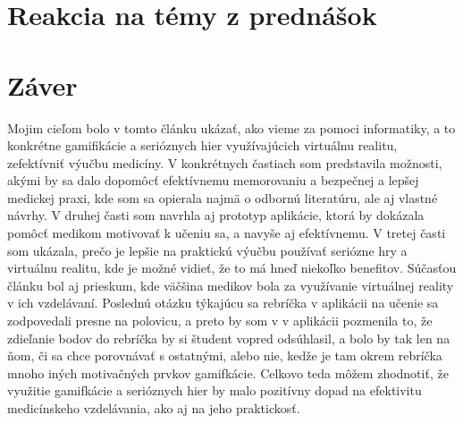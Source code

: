 \documentclass[10pt,twoside,slovak,a4paper]{article}
\begin{document}
\section{Reakcia na témy z prednášok} \label{prednasky}


\section{Záver} \label{zaver} 
Mojim cieľom bolo v tomto článku ukázať, ako vieme za pomoci informatiky, a to konkrétne gamifikácie a serióznych hier využívajúcich virtuálnu realitu, zefektívniť výučbu medicíny. V konkrétnych častiach som predstavila možnosti, akými by sa dalo dopomôcť efektívnemu memorovaniu a bezpečnej a lepšej medickej praxi, kde som sa opierala najmä o odbornú literatúru, ale aj vlastné návrhy. V druhej časti som navrhla aj prototyp aplikácie, ktorá by dokázala pomôcť medikom motivovať k učeniu sa, a navyše aj efektívnemu. V tretej časti som ukázala, prečo je lepšie na praktickú výučbu používať seriózne hry a virtuálnu realitu, kde je možné vidieť, že to má hneď niekoľko benefitov. Súčasťou článku bol aj prieskum, kde väčšina medikov bola za využívanie virtuálnej reality v ich vzdelávaní. Poslednú otázku týkajúcu sa rebríčka v aplikácii na učenie sa zodpovedali presne na polovicu, a preto by som v v aplikácii pozmenila to, že zdieľanie bodov do rebríčka by si študent vopred odsúhlasil, a bolo by tak len na ňom, či sa chce porovnávať s ostatnými, alebo nie, kedže je tam okrem rebríčka mnoho iných motivačných prvkov gamifkácie. Celkovo teda môžem zhodnotiť, že využitie gamifkácie a serióznych hier by malo pozitívny dopad na efektivitu medicínskeho vzdelávania, ako aj na jeho praktickosť.




\end{document}
